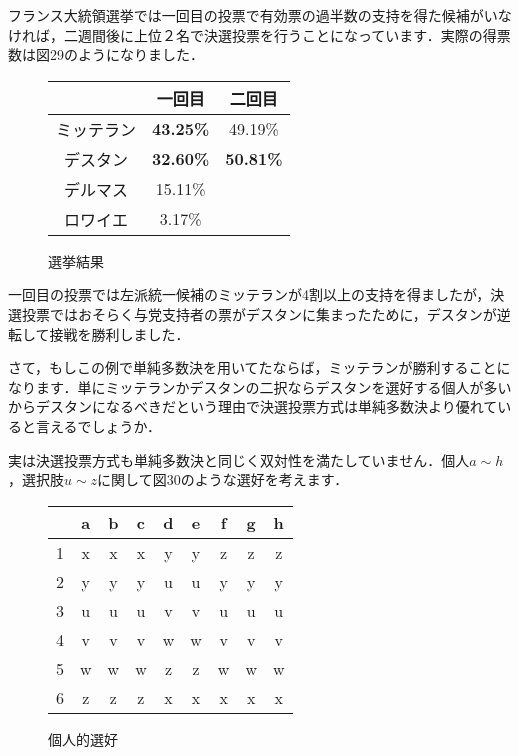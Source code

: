 フランス大統領選挙では一回目の投票で有効票の過半数の支持を得た候補がいなければ，二週間後に上位２名で決選投票を行うことになっています．実際の得票数は図29のようになりました．
\begin{figure}[!h]
    \centering
    \begin{tabular}[!h]{|c|c|c|} \hline
        & 一回目 & 二回目 \\ \hline
        ミッテラン & {\bf 43.25\%} & 49.19\% \\ \hline
        デスタン   & {\bf 32.60\%} & {\bf 50.81\%} \\ \hline
        デルマス   & 15.11\% & \\ \hline
        ロワイエ   & 3.17\%  & \\ \hline
    \end{tabular}
    \caption{選挙結果 \protect\footnotemark}
\end{figure}
一回目の投票では左派統一候補のミッテランが4割以上の支持を得ましたが，決選投票ではおそらく与党支持者の票がデスタンに集まったために，デスタンが逆転して接戦を勝利しました．

さて，もしこの例で単純多数決を用いてたならば，ミッテランが勝利することになります．単にミッテランかデスタンの二択ならデスタンを選好する個人が多いからデスタンになるべきだという理由で決選投票方式は単純多数決より優れていると言えるでしょうか．

実は決選投票方式も単純多数決と同じく双対性を満たしていません．個人$a \sim h$，選択肢$u \sim z$に関して図30のような選好を考えます．

\begin{figure}[!h]
    \centering
    \begin{tabular}[!h]{|c|c|c|c|c|c|c|c|c|} \hline
          & a & b & c & d & e & f & g & h \\ \hline
        1 & x & x & x & y & y & z & z & z \\ \hline
        2 & y & y & y & u & u & y & y & y \\ \hline
        3 & u & u & u & v & v & u & u & u \\ \hline
        4 & v & v & v & w & w & v & v & v \\ \hline
        5 & w & w & w & z & z & w & w & w \\ \hline
        6 & z & z & z & x & x & x & x & x \\ \hline
    \end{tabular}
    \caption{個人的選好}
\end{figure}

